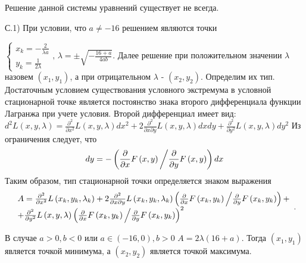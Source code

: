 \documentclass[addpoints]{exam} %
\begin{document}
\begin{questions}
\begin{solution}
Решение данной системы уравнений существует не всегда. 

С.1) При условии, что $a\ne -16$ решением являются точки

 $\left\{\begin{array}{c} {x_{k} =-\frac{2}{\lambda a} } \\ {y_{k} =\frac{1}{2\lambda } } \end{array}\right. ,\, \lambda =\pm \sqrt{-\frac{16+a}{4ab} } $. Далее решение при положительном значении $\lambda $ назовем $\left(x_{1} ,y_{1} \right)$, а при отрицательном $\lambda $ - $\left(x_{2} ,y_{2} \right)$. Определим их тип. Достаточным условием существования условного экстремума в условной стационарной точке является постоянство знака второго дифференциала функции Лагранжа при учете условия. Второй дифференциал имеет вид: $d^{2} L\left(x,y,\lambda \right)=\frac{\partial ^{2} }{\partial x^{2} } L\left(x,y,\lambda \right)dx^{2} +2\frac{\partial ^{2} }{\partial x\partial y} L\left(x,y,\lambda \right)dxdy+\frac{\partial ^{2} }{\partial y^{2} } L\left(x,y,\lambda \right)dy^{2} $ Из ограничения следует, что 
\[
dy=-\left({\frac{\partial }{\partial x} F\left(x,y\right) \mathord{\left/{\vphantom{\frac{\partial }{\partial x} F\left(x,y\right) \frac{\partial }{\partial y} F\left(x,y\right)}}\right.\kern-\nulldelimiterspace} \frac{\partial }{\partial y} F\left(x,y\right)} \right)dx
\]
Таким образом, тип стационарной точки определяется знаком выражения 
\[
\begin{array}{l} {A=\frac{\partial ^{2} }{\partial x^{2} } L\left(x_{k} ,y_{k} ,\lambda _{k} \right)+2\frac{\partial ^{2} }{\partial x\partial y} L\left(x_{k} ,y_{k} ,\lambda _{k} \right)\left({\frac{\partial }{\partial x} F\left(x_{k} ,y_{k} \right) \mathord{\left/{\vphantom{\frac{\partial }{\partial x} F\left(x_{k} ,y_{k} \right) \frac{\partial }{\partial y} F\left(x_{k} ,y_{k} \right)}}\right.\kern-\nulldelimiterspace} \frac{\partial }{\partial y} F\left(x_{k} ,y_{k} \right)} \right)+} \\ {+\frac{\partial ^{2} }{\partial y^{2} } L\left(x,y,\lambda \right)\left({\frac{\partial }{\partial x} F\left(x_{k} ,y_{k} \right) \mathord{\left/{\vphantom{\frac{\partial }{\partial x} F\left(x_{k} ,y_{k} \right) \frac{\partial }{\partial y} F\left(x_{k} ,y_{k} \right)}}\right.\kern-\nulldelimiterspace} \frac{\partial }{\partial y} F\left(x_{k} ,y_{k} \right)} \right)^{2} } \end{array}.
\] 

В случае $a>0,b<0$ или $a\in \left(-16,0\right),b>0$ $A=2\lambda (16+a)$. Тогда $\left(x_{1} ,y_{1} \right)$ является точкой минимума, а $\left(x_{2} ,y_{2} \right)$ является точкой максимума.


\end{solution}
\end{questions}
\end{document}

